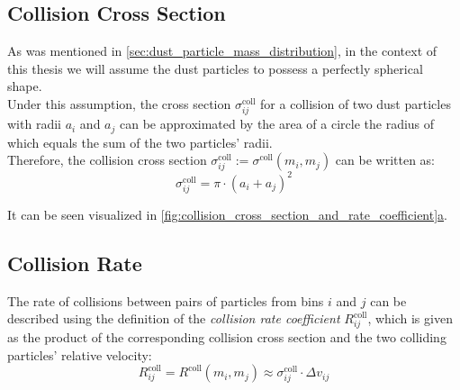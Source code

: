 
    \subsection{Collision Cross Section}
        
        As was mentioned in \cref{sec:dust_particle_mass_distribution}, in the context of 
        this thesis we will assume the dust particles to possess a perfectly spherical shape. \\

        Under this assumption, the cross section $\sigma^\text{coll}_{ij}$ for a collision of two
        dust particles with radii $a_i$ and $a_j$ can be approximated by the area of a circle the 
        radius of which equals the sum of the two particles' radii. \\

        Therefore, the collision cross section 
        $\sigma^\text{coll}_{ij} := \sigma^\text{coll}(m_i, m_j)$ 
        can be written as:
        \begin{equation}
            \sigma^\text{coll}_{ij} = \pi \cdot (a_i+a_j)^2
        \end{equation}

        It can be seen visualized in 
        \hyperref[fig:collision_cross_section_and_rate_coefficient]
        {\cref*{fig:collision_cross_section_and_rate_coefficient}a}.

        

    \clearpage\subsection{Collision Rate}

        The rate of collisions between pairs of particles from bins $i$ and $j$ can be 
        described using the definition of the \textit{collision rate coefficient} 
        $R^\text{coll}_{ij}$, which is given as the product of the corresponding collision 
        cross section and the two colliding particles' relative velocity: 
        \begin{equation}
            R^\text{coll}_{ij} 
            = R^\text{coll}(m_i,m_j) 
            \approx \sigma^\text{coll}_{ij} \cdot \Delta v_{ij}
        \end{equation}

